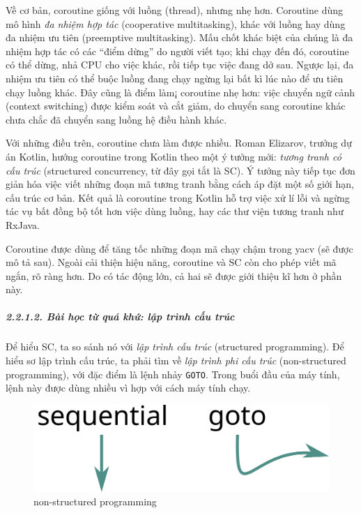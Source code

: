 \documentclass[
]{article}
\begin{document}
Về cơ bản, coroutine giống với luồng (thread), nhưng nhẹ hơn. Coroutine
dùng mô hình \emph{đa nhiệm hợp tác} (cooperative multitasking), khác
với luồng hay dùng đa nhiệm ưu tiên (preemptive multitasking). Mấu chốt
khác biệt của chúng là đa nhiệm hợp tác có các ``điểm dừng'' do người
viết tạo; khi chạy đến đó, coroutine có thể dừng, nhả CPU cho việc khác,
rồi tiếp tục việc đang dở sau. Ngược lại, đa nhiệm ưu tiên có thể buộc
luồng đang chạy ngừng lại bất kì lúc nào để ưu tiên chạy luồng khác. Đây
cũng là điểm làm¡ coroutine nhẹ hơn: việc chuyển ngữ cảnh (context
switching) được kiểm soát và cắt giảm, do chuyển sang coroutine khác
chưa chắc đã chuyển sang luồng hệ điều hành khác.

Với những điều trên, coroutine chưa làm được nhiều. Roman Elizarov,
trưởng dự án Kotlin, hướng coroutine trong Kotlin theo một ý tưởng mới:
\emph{tương tranh có cấu trúc} (structured concurrency, từ đây gọi tắt
là SC). Ý tưởng này tiếp tục đơn giản hóa việc viết những đoạn mã tương
tranh bằng cách áp đặt một số giới hạn, cấu trúc cơ bản. Kết quả là
coroutine trong Kotlin hỗ trợ việc xử lí lỗi và ngừng tác vụ bất đồng bộ
tốt hơn việc dùng luồng, hay các thư viện tương tranh như RxJava.

Coroutine được dùng để tăng tốc những đoạn mã chạy chậm trong yacv (sẽ
được mô tả sau). Ngoài cải thiện hiệu năng, coroutine và SC còn cho phép
viết mã ngắn, rõ ràng hơn. Do có tác động lớn, cả hai sẽ được giới thiệu
kĩ hơn ở phần này.

\hypertarget{buxe0i-hux1ecdc-tux1eeb-quuxe1-khux1ee9-lux1eadp-truxecnh-cux1ea5u-truxfac}{%
\subparagraph{2.2.1.2. Bài học từ quá khứ: lập trình cấu
trúc}\label{buxe0i-hux1ecdc-tux1eeb-quuxe1-khux1ee9-lux1eadp-truxecnh-cux1ea5u-truxfac}}

Để hiểu SC, ta so sánh nó với \emph{lập trình cấu trúc} (structured
programming). Để hiểu sơ lập trình cấu trúc, ta phải tìm về \emph{lập
trình phi cấu trúc} (non-structured programming), với đặc điểm là lệnh
nhảy \texttt{GOTO}. Trong buổi đầu của máy tính, lệnh này được dùng
nhiều vì hợp với cách máy tính chạy.

\begin{figure}
\centering
\includegraphics{../images/sequential-and-go-to-schematic.svg}
\caption{non-structured programming}
\end{figure}
\end{document}
